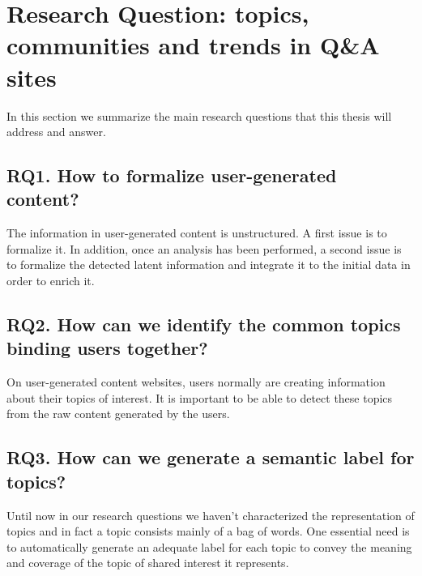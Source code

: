 \section{Research Question: topics, communities and trends in Q\&A sites}
In this section we summarize the main research questions that this thesis will address and answer.

\subsection*{RQ1. How to formalize user-generated content?}
The information in user-generated content is unstructured. A first issue is to formalize it. In addition, once an analysis has been performed, a second issue is to formalize the detected latent information and integrate it to the initial data in order to enrich it.

\subsection*{RQ2. How can we identify the common topics binding users together?}
On user-generated content websites, users  normally are creating information about their topics of interest. It is important to be able to detect these topics from the raw content generated by the users.

\subsection*{RQ3. How can we generate a semantic label for topics?}
Until now in our research questions we haven't characterized the representation of topics and in fact a topic consists mainly of a bag of words. One essential need is to automatically generate an adequate label for each topic to convey the meaning and coverage of the topic of shared interest it represents.

